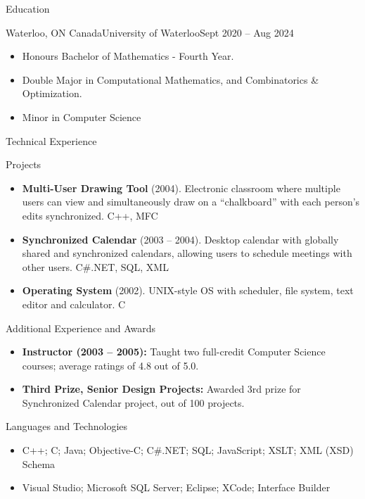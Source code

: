 \documentclass[]{mcdowellcv}
\begin{document}
	\begin{cvsection}{Education}
		\begin{cvsubsection}{Waterloo, ON Canada}{University of Waterloo}{Sept 2020 -- Aug 2024}
			\begin{itemize}
				\item Honours Bachelor of Mathematics - Fourth Year.
				\item Double Major in Computational Mathematics, and Combinatorics \& Optimization.
				\item Minor in Computer Science
			\end{itemize}
		\end{cvsubsection}
	\end{cvsection}
	
	\begin{cvsection}{Technical Experience}
		\begin{cvsubsection}{Projects}{}{}
			\begin{itemize}
				\item \textbf{Multi-User Drawing Tool} (2004). Electronic classroom where multiple users can view and simultaneously draw on a “chalkboard” with each person’s edits synchronized.  C++, MFC
				\item \textbf{Synchronized Calendar} (2003 – 2004). Desktop calendar with globally shared and synchronized calendars, allowing users to schedule meetings with other users.  C\#.NET, SQL, XML
				\item \textbf{Operating System} (2002).  UNIX-style OS with scheduler, file system, text editor and calculator. C
			\end{itemize}
		\end{cvsubsection}
	\end{cvsection}
	
	\begin{cvsection}{Additional Experience and Awards}
		\begin{cvsubsection}{}{}{}	
			\begin{itemize}
				\item \textbf{Instructor (2003 – 2005):} Taught two full-credit Computer Science courses; average ratings of 4.8 out of 5.0.
				\item \textbf{Third Prize, Senior Design Projects:} Awarded 3rd prize for Synchronized Calendar project, out of 100 projects.
			\end{itemize}
		\end{cvsubsection}
	\end{cvsection}
	
	\begin{cvsection}{Languages and Technologies}
		\begin{cvsubsection}{}{}{}	
			\begin{itemize}
				\item C++; C; Java; Objective-C; C\#.NET; SQL; JavaScript; XSLT; XML (XSD) Schema 
				\item Visual Studio; Microsoft SQL Server; Eclipse; XCode; Interface Builder
			\end{itemize}
		\end{cvsubsection}
	\end{cvsection}
	
\end{document}
